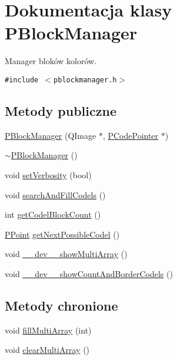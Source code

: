 \hypertarget{classPBlockManager}{
\section{Dokumentacja klasy PBlockManager}
\label{classPBlockManager}
}
Manager bloków kolorów.  


{\tt \#include $<$pblockmanager.h$>$}

\subsection*{Metody publiczne}
\begin{CompactItemize}
\item 
\hyperlink{classPBlockManager_f5a95fca85a31c0257b38b57cbb3378a}{PBlockManager} (QImage $\ast$, \hyperlink{classPCodePointer}{PCodePointer} $\ast$)
\item 
\hyperlink{classPBlockManager_52d7abb7f858625e9e014fb555f571a6}{$\sim$PBlockManager} ()
\item 
void \hyperlink{classPBlockManager_926e182e360300d6524fbb01fb90866b}{setVerbosity} (bool)
\item 
void \hyperlink{classPBlockManager_88f9f5226179e0fbd9d148001de10e97}{searchAndFillCodels} ()
\item 
int \hyperlink{classPBlockManager_ba7919eedd6b806f2f4da408423723ea}{getCodelBlockCount} ()
\item 
\hyperlink{structstruct__point}{PPoint} \hyperlink{classPBlockManager_667f3673eda6cf4476ecb34d01db665b}{getNextPossibleCodel} ()
\item 
void \hyperlink{classPBlockManager_e6298891058bd316c07071db0c851b2f}{\_\-\_\-dev\_\-\_\-showMultiArray} ()
\item 
void \hyperlink{classPBlockManager_d0ed8ac41d59c34eb88aa30428961a82}{\_\-\_\-dev\_\-\_\-showCountAndBorderCodels} ()
\end{CompactItemize}
\subsection*{Metody chronione}
\begin{CompactItemize}
\item 
void \hyperlink{classPBlockManager_c31dc0993286be444a82ae5e51f32415}{fillMultiArray} (int)
\item 
void \hyperlink{classPBlockManager_ab82616c7ee28fa12d4cfec944f550a0}{clearMultiArray} ()
\end{CompactItemize}
